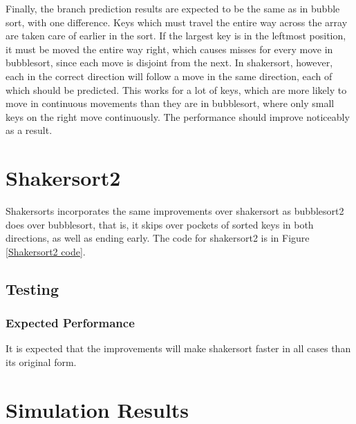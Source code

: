 Finally, the branch prediction results are expected to be the same as in bubble
sort, with one difference.  Keys which must travel the entire way across the
array are taken care of earlier in the sort. If the largest key is in the
leftmost position, it must be moved the entire way right, which causes misses
for every move in bubblesort, since each move is disjoint from the next. In
shakersort, however, each in the correct direction will follow a move in the
same direction, each of which should be predicted. This works for a lot of
keys, which are more likely to move in continuous movements than they are in
bubblesort, where only small keys on the right move continuously. The
performance should improve noticeably as a result.

\section{Shakersort2}
Shakersorts incorporates the same improvements over shakersort as bubblesort2
does over bubblesort, that is, it skips over pockets of sorted keys in both
directions, as well as ending early. The code for shakersort2 is in Figure
\vref{Shakersort2 code}.

\subsection{Testing}
\subsubsection{Expected Performance}
It is expected that the improvements will make shakersort faster in all cases
than its original form.

\section{Simulation Results}

